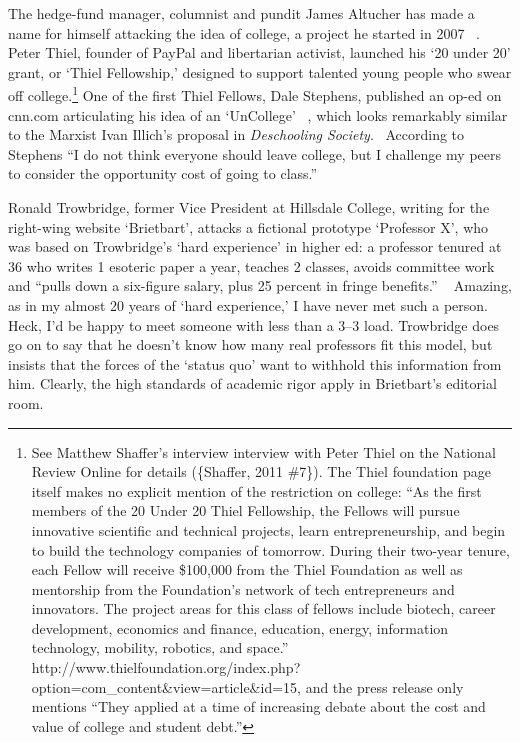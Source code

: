 The hedge-fund manager, columnist and pundit James Altucher has made a name for himself attacking the idea of college, a project he started in 2007 ~\citep{Altucher:2007up}. Peter Thiel, founder of PayPal and libertarian activist, launched his `20 under 20' grant, or `Thiel Fellowship,' designed to support talented young people who swear off college.\footnote{See Matthew Shaffer's interview interview with Peter Thiel on the National Review Online for details (\{Shaffer, 2011 \#7\}). The Thiel foundation page itself makes no explicit mention of the restriction on college: ``As the first members of the 20 Under 20 Thiel Fellowship, the Fellows will pursue innovative scientific and technical projects, learn entrepreneurship, and begin to build the technology companies of tomorrow. During their two-year tenure, each Fellow will receive \$100,000 from the Thiel Foundation as well as mentorship from the Foundation's network of tech entrepreneurs and innovators. The project areas for this class of fellows include biotech, career development, economics and finance, education, energy, information technology, mobility, robotics, and space.'' http:\slash \slash www.thielfoundation.org\slash index.php?option=com\_content\&view=article\&id=15, and the press release only mentions ``They applied at a time of increasing debate about the cost and value of college and student debt.''} One of the first Thiel Fellows, Dale Stephens, published an op-ed on cnn.com articulating his idea of an `UnCollege' ~\citep{Anonymous:YqIBmpEq}, which looks remarkably similar to the Marxist Ivan Illich's proposal in \emph{Deschooling Society}.~\citep{Illich:1971vi} According to Stephens ``I do not think everyone should leave college, but I challenge my peers to consider the opportunity cost of going to class.''

Ronald Trowbridge, former Vice President at Hillsdale College, writing for the right-wing website `Brietbart', attacks a fictional prototype `Professor X', who was based on Trowbridge's `hard experience' in higher ed: a professor tenured at 36 who writes 1 esoteric paper a year, teaches 2 classes, avoids committee work and ``pulls down a six-figure salary, plus 25 percent in fringe benefits.'' ~\citep{Trowbridge:2012to} Amazing, as in my almost 20 years of `hard experience,' I have never met such a person. Heck, I'd be happy to meet someone with less than a 3--3 load. Trowbridge does go on to say that he doesn't know how many real professors fit this model, but insists that the forces of the `status quo' want to withhold this information from him. Clearly, the high standards of academic rigor apply in Brietbart's editorial room.

